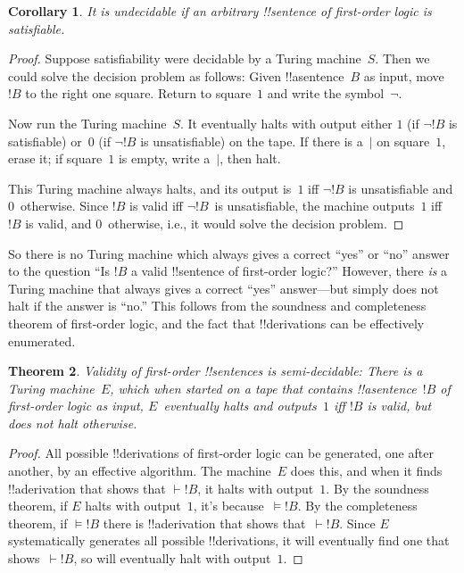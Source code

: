 \documentclass[10pt,a4paper]{article}
\theoremstyle{plain}
\newtheorem{thm}{Theorem}[section]
\newtheorem{cor}[thm]{Corollary}
\theoremstyle{definition}
\theoremstyle{remark}
\newenvironment{explain}{}{}
\newcommand*{\ollabel}[1]{\label{#1}}
\providecommand{\Proves}{\mathrel{\vdash}}
\providecommand{\Entails}{\mathrel{\models}}
\providecommand{\TMstroke}{\mid}
\begin{document}
\begin{cor}\ollabel{cor:undecidable-sat}%
It is undecidable if an arbitrary !!{sentence} of first-order logic is satisfiable.
\end{cor}

\begin{proof}
  Suppose satisfiability were decidable by a Turing machine~$S$. Then
  we could solve the decision problem as follows: Given
  !!a{sentence}~$B$ as input, move $!B$ to the right one square.
  Return to square~$1$ and write the symbol~$\lnot$.

  Now run the Turing machine~$S$. It eventually halts with output
  either $1$ (if $\lnot !B$ is satisfiable) or~$0$ (if $\lnot !B$ is
  unsatisfiable) on the tape. If there is a~$\TMstroke$ on square~$1$,
  erase it; if square~$1$ is empty, write a~$\TMstroke$, then halt.

  This Turing machine always halts, and its output is~$1$ iff $\lnot
  !B$ is unsatisfiable and $0$~otherwise. Since $!B$ is valid iff
  $\lnot !B$~is unsatisfiable, the machine outputs~$1$ iff $!B$ is
  valid, and $0$~otherwise, i.e., it would solve the decision problem.
\end{proof}

\begin{explain}
So there is no Turing machine which always gives a
correct ``yes'' or ``no'' answer to the question ``Is $!B$ a valid
!!{sentence} of first-order logic?'' However, there \emph{is} a Turing
machine that always gives a correct ``yes'' answer---but simply does
not halt if the answer is ``no.'' This follows from the soundness and
completeness theorem of first-order logic, and the fact that
!!{derivation}s can be effectively enumerated.
\end{explain}

\begin{thm}
  \ollabel{thm:valid-ce}%
  Validity of first-order !!{sentence}s is semi-decidable: There is a
  Turing machine~$E$, which when started on a tape that contains
  !!a{sentence}~$!B$ of first-order logic as input, $E$~eventually
  halts and outputs~$1$ iff $!B$ is valid, but does not halt
  otherwise.
\end{thm}

\begin{proof}
  All possible !!{derivation}s of first-order logic can be generated,
  one after another, by an effective algorithm.  The machine~$E$ does
  this, and when it finds !!a{derivation} that shows that $\Proves
  !B$, it halts with output~$1$. By the soundness theorem, if $E$
  halts with output~$1$, it's because~$\Entails !B$. By the
  completeness theorem, if $\Entails !B$ there is !!a{derivation} that
  shows that~$\Proves !B$. Since $E$ systematically generates all
  possible !!{derivation}s, it will eventually find one that
  shows~$\Proves !B$, so will eventually halt with output~$1$.
\end{proof}
\end{document}
